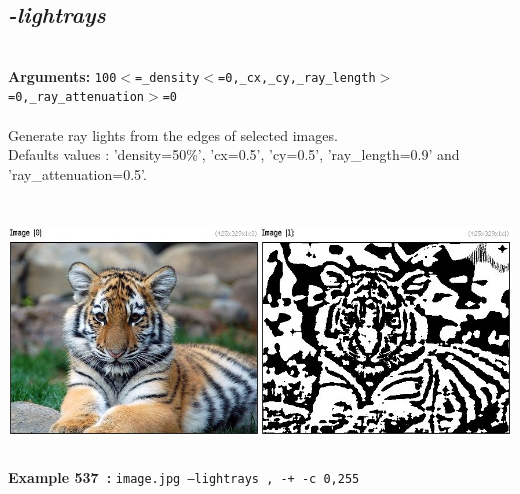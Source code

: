 \documentclass[a4paper,11pt,twoside]{book}
\begin{document}
\subsection{\emph{-lightrays} }\vspace*{-0.5em}
~\\\textbf{Arguments: } 
{\small \texttt{100$<$=\_density$<$=0,\_cx,\_cy,\_ray\_length$>$=0,\_ray\_attenuation$>$=0}}\\~\\
Generate ray lights from the edges of selected images.
~\\Defaults values : 'density=50\%', 'cx=0.5', 'cy=0.5', 'ray\_length=0.9' and 'ray\_attenuation=0.5'.
\begin{center}\includegraphics[keepaspectratio=true,height=7cm,width=\textwidth]{img/gmic_def537.jpg}\\
{\footnotesize \textbf{Example 537~:} \texttt{image.jpg --lightrays , -+ -c 0,255}}
\end{center}
\end{document}
